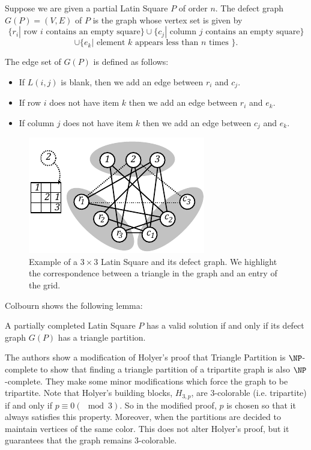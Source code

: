 \documentclass[runningheads,a4paper]{llncs}
\begin{document}
\begin{definition}
Suppose we are given a partial Latin Square $P$ of order $n$. The defect graph $G(P) = (V,E)$ of $P$ is the graph whose vertex set is given by $$\{ r_i | \text{ row } i \text{ contains an empty square} \} \cup \{ c_j | \text{ column } j \text{ contains an empty square} \} $$
$$ \cup \{ e_k | \text{ element } k\text{ appears less than } n \text{ times } \} .$$ 

The edge set of $G(P)$ is defined as follows: 

\begin{itemize}
	\item If $L(i,j)$ is blank, then we add an edge between $r_i$ and $c_j$. 
	\item If row $i$ does not have item $k$ then we add an edge between $r_i$ and $e_k$. 
	\item If column $j$ does not have item $k$ then we add an edge between $c_j$ and $e_k$.
\end{itemize}
\end{definition}

\begin{figure}
\centering
\label{fig:LStoTrianglePartitionExample}
\includegraphics[width=0.5\linewidth]{latinsquare_to_triangle_part_2.pdf}
\caption{Example of a $3\times 3$ Latin Square and its defect graph. We highlight the correspondence between a triangle in the graph and an entry of the grid.}
\end{figure}

Colbourn \cite{colbourn1984complexity} shows the following lemma: 
\begin{lemma}\label{TP:lemma}
A partially completed Latin Square $P$ has a valid solution if and only if its defect graph $G(P)$ has a triangle partition. 
 \end{lemma}
 
The authors show a modification of Holyer's proof that Triangle Partition is $\NP$-complete to show that finding a triangle partition of a tripartite graph is also $\NP$-complete. They make some minor modifications which force the graph to be tripartite. Note that Holyer's building blocks, $H_{3,p}$, are 3-colorable (i.e. tripartite) if and only if $p \equiv 0 (\mod 3)$. So in the modified proof, $p$ is chosen so that it always satisfies this property. Moreover, when the partitions are decided to maintain vertices of the same color. This does not alter Holyer's proof, but it guarantees that the graph remains 3-colorable. 
\end{document}
